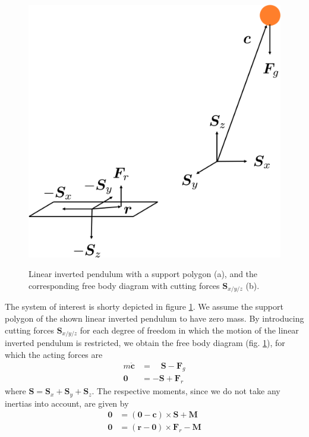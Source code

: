 \begin{figure}[h!]
	[.4\linewidth]{\includegraphics[scale=.3]{chapters/02_background/img/inverted_pendulum_free_body_diagram.png}}
	\caption{Linear inverted pendulum with a support polygon (a), and the corresponding free body diagram with cutting forces $\bm{S}_{x/y/z}$ (b).}
	\label{fig::211_lip}
\end{figure}
The system of interest is shorty depicted in figure \ref{fig::211_lip}. We assume the support polygon of the shown linear inverted pendulum to have zero mass. By introducing cutting forces $\bm{S}_{x/y/z}$ for each degree of freedom in which the motion of the linear inverted pendulum is restricted, we obtain the free body diagram (fig. \ref{fig::211_lip}), for which the acting forces are
\begin{align}
	m\ddot{\bm{c}} &=\quad\bm{S} - \bm{F}_g 
	\label{eq::211_pendulum_force} \\
	\bm{0} &= -\bm{S}+\bm{F}_r
	\label{eq::211_support_polygon_force}
\end{align}
where $\bm{S}=\bm{S}_x+\bm{S}_y+\bm{S}_z$. The respective moments, since we do not take any inertias into account, are given by
\begin{align}
	\bm{0} &= (\bm{0}-\bm{c})\times\bm{S} + \bm{M} 
	\label{eq::211_pendulum_moment}\\	
	\bm{0} &= (\bm{r}-\bm{0})\times\bm{F}_r - \bm{M}
	\label{eq::211_support_polygon_moment}	
\end{align}

